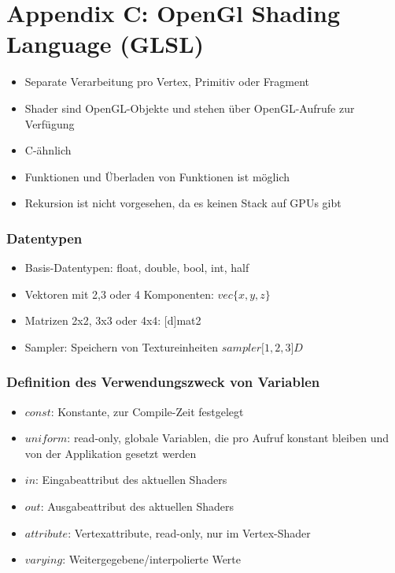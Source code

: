 \section{Appendix C: OpenGl Shading Language (GLSL)}
\begin{itemize}
	\item Separate Verarbeitung pro Vertex, Primitiv oder Fragment
	\item Shader sind OpenGL-Objekte und stehen über OpenGL-Aufrufe zur Verfügung
	\item C-ähnlich
	\item Funktionen und Überladen von Funktionen ist möglich
	\item Rekursion ist nicht vorgesehen, da es keinen Stack auf GPUs gibt
\end{itemize}

\subsubsection{Datentypen}
\begin{itemize}
	\item Basis-Datentypen: float, double, bool, int, half
	\item Vektoren mit 2,3 oder 4 Komponenten: \(vec\{x,y,z\}\)
	\item Matrizen 2x2, 3x3 oder 4x4: [d]mat2
	\item Sampler: Speichern von Textureinheiten \(sampler\lbrack 1,2,3\rbrack D\)
\end{itemize}

\subsubsection{Definition des Verwendungszweck von Variablen}
\begin{itemize}
	\item \(const\): Konstante, zur Compile-Zeit festgelegt
	\item \(uniform\): read-only, globale Variablen, die pro Aufruf konstant bleiben und von der Applikation gesetzt werden
	\item \(in\): Eingabeattribut des aktuellen Shaders
	\item \(out\): Ausgabeattribut des aktuellen Shaders
	\item \(attribute\): Vertexattribute, read-only, nur im Vertex-Shader
	\item \(varying\): Weitergegebene/interpolierte Werte
\end{itemize}

